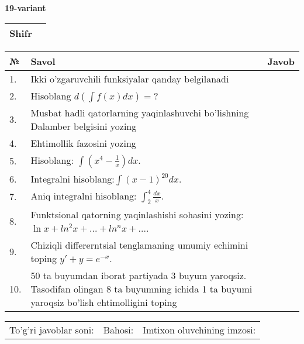 \documentclass{article}
\begin{document}
  \egroup
  
  \newpage
  
  
  \textbf{19-variant}\\
  
  \bgroup
  \def\arraystretch{1.6} %
  
  \begin{tabular}{|m{5.7cm}|m{9.5cm}|}
  \hline
  Shifr & \\
  \hline
  \end{tabular}
  
  \vspace{1cm}
  
  \begin{tabular}{|m{0.7cm}|m{10cm}|m{4cm}|}
  \hline
  № & Savol & Javob \\
  \hline
  1. & Ikki o'zgaruvchili funksiyalar qanday belgilanadi &  \\
  \hline
  2. & Hisoblang \(d\left( \int {f(x)dx} \right) = ?\) &  \\
  \hline
  3. & Musbat hadli qatorlarning yaqinlashuvchi bo'lishning Dalamber belgisini yozing &  \\
  \hline
  4. & Ehtimollik fazosini yozing &  \\
  \hline
  5. & Hisoblang: \(\int \left( x^{4} - \frac{1}{x} \right)dx\). &  \\
  \hline
  6. & Integralni hisoblang:\(\int {(x - 1)^{20}}dx\). &  \\
  \hline
  7. & Aniq integralni hisoblang: \(\int_{2}^{4}\frac{dx}{x}\). &  \\
  \hline
  8. & Funktsional qatorning yaqinlashishi sohasini yozing: \(\ln x + ln^{2}x + ... + ln^{n}x + ...\). &  \\
  \hline
  9. & Chiziqli differerntsial tenglamaning umumiy echimini toping \(y' + y = e^{- x}\). &  \\
  \hline
  10. & 50 ta buyumdan iborat partiyada 3 buyum yaroqsiz. Tasodifan olingan 8 ta buyumning ichida 1 ta buyumi yaroqsiz bo'lish ehtimolligini toping &  \\
  \hline
  \end{tabular}
  
  \vspace{1cm}
  
  \begin{tabular}{lll}
  To'g'ri javoblar soni: \underline{\hspace{1.5cm}} & 
  Bahosi: \underline{\hspace{1.5cm}} & 
  Imtixon oluvchining imzosi: \underline{\hspace{2cm}} \\
  \end{tabular}
  
\end{document}
